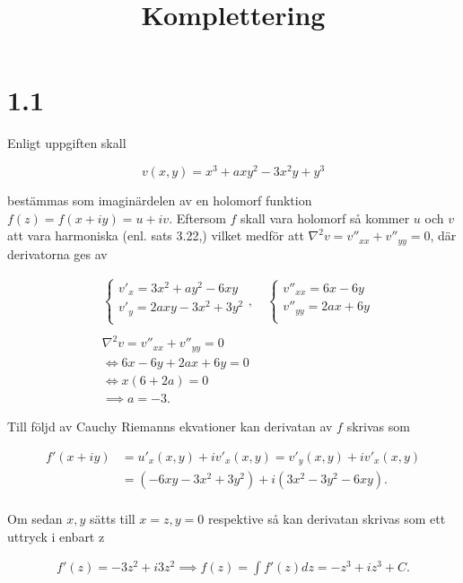 \documentclass[a4paper]{article}
\title{Komplettering}
\begin{document}
\maketitle

\section*{1.1}

Enligt uppgiften skall

\begin{equation*}
	v(x,y) = x^3 + axy^2 - 3x^2y + y^3
\end{equation*}

bestämmas som imaginärdelen av en holomorf funktion $f(z) = f(x + iy) = u + iv$. Eftersom $f$ skall vara holomorf så kommer $u$ och $v$ att vara harmoniska (enl. sats 3.22,) vilket medför att $\nabla^2v = v''_{xx} + v''_{yy} = 0$, där derivatorna ges av

\begin{align*}
	&\begin{cases}
		v'_x = 3x^2 + ay^2 - 6xy\\
		v'_y = 2axy - 3x^2 + 3y^2\\
	\end{cases}
	,\quad
	\begin{cases}
		v''_{xx} = 6x - 6y\\
		v''_{yy} = 2ax + 6y\\
	\end{cases}\\
	&\\
	&\nabla^2v = v''_{xx} + v''_{yy} = 0\\
	&\iff 6x - 6y + 2ax + 6y = 0\\
	&\iff x(6+2a) = 0\\
	&\implies a = -3.
\end{align*}

Till följd av Cauchy Riemanns ekvationer kan derivatan av $f$ skrivas som 

\begin{align*}
	f'(x + iy)	&= u'_x(x,y) + iv'_x(x,y) = v'_y(x,y) + iv'_x(x,y)\\
				&= (-6xy - 3x^2 + 3y^2) + i(3x^2 - 3y^2 - 6xy).\\
\end{align*}

Om sedan $x,y$ sätts till $x = z, y = 0$ respektive så kan derivatan skrivas som ett uttryck i enbart z

\begin{align*}
	f'(z) = -3z^2 + i3z^2
	\implies f(z) = \int f'(z)dz = -z^3 + iz^3 + C.
\end{align*}
\end{document}
